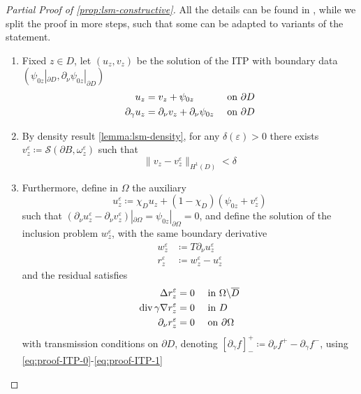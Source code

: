 \documentclass[10pt, a4paper, twoside, openright]{book}
\theoremstyle{definition}
\theoremstyle{plain}
\theoremstyle{plain}
\theoremstyle{plain}
\theoremstyle{plain}
\theoremstyle{plain}
\theoremstyle{plain}
\theoremstyle{plain}
\theoremstyle{plain}
\DeclareMathOperator{\divergence}{div}
\let\epsilon\varepsilon
\begin{document}
\begin{proof}
 [Partial Proof of \ref{prop:lsm-constructive}]
 All the details can be found in \cite{somersalo:preprint}, while we split the proof in more steps, such that some can be adapted to variants of the statement.
 \begin{enumerate}
  \item Fixed $z\in D$, let $(u_z, v_z)$ be the solution of the ITP with boundary data $(\psi_{0z}|_{\partial D}, \partial_\nu\psi_{0z}|_{\partial D})$
  \begin{subequations}
  \begin{align}
   u_z &= v_z + \psi_{0z} &&\textup{ on }\partial D  \label{eq:proof-ITP-0} \\
   \partial_\gamma u_z &= \partial_\nu v_z + \partial_\nu \psi_{0z}   &&\textup{ on }\partial D \label{eq:proof-ITP-1}
  \end{align}
  \end{subequations}
  \item By density result \ref{lemma:lsm-density}, for any $\delta(\epsilon)>0$ there exists $v^\epsilon_z\coloneqq\mathcal{S}(\partial B, \omega^\epsilon_z)$ such that
  \begin{equation}
   \|v_z-v_z^\epsilon\|_{H^1(D)}<\delta
  \end{equation}
  \item Furthermore, define in $\Omega$ the auxiliary 
  \begin{equation}
   u^\epsilon_z\coloneqq\chi_Du_z + (1-\chi_D)(\psi_{0z} + v^\epsilon_z) 
  \end{equation}
  such that $(\partial_\nu u^\epsilon_z -\partial_\nu v^\epsilon_z )|_{\partial\Omega}=\psi_{0z}|_{\partial\Omega}=0$, and define the solution of the inclusion problem $w^\epsilon_z$, with the same boundary derivative
  \begin{align}
   w^\epsilon_z&\coloneqq T\partial_\nu u^\epsilon_z \\
   r^\epsilon_z&\coloneqq w^\epsilon_z - u^\epsilon_z
  \end{align}
  and the residual satisfies 
  \begin{align}
  \Delta r^\epsilon_z & = 0 \quad \textup{ in }\Omega\backslash\overline{D} \\
  \divergence\gamma\nabla r^\epsilon_z &= 0  \quad \textup{ in }D \\
  \partial_\nu r^\epsilon_z &=0 \quad \textup{ on }\partial \Omega
  \end{align}
  with transmission conditions on $\partial D$, denoting $[\partial_\gamma f]^+_- \coloneqq \partial_\nu f^+ - \partial_\gamma f^-$, using \ref{eq:proof-ITP-0}-\ref{eq:proof-ITP-1}

\end{enumerate}
\end{proof}
\end{document}
